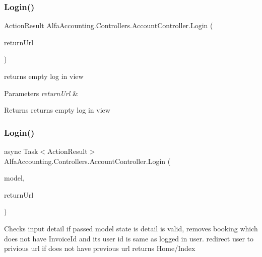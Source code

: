 \subsubsection{\texorpdfstring{Login()}{Login()}\hspace{0.1cm}{\footnotesize\ttfamily [1/2]}}
{\footnotesize\ttfamily Action\+Result Alfa\+Accounting.\+Controllers.\+Account\+Controller.\+Login (\begin{DoxyParamCaption}\item[{string}]{return\+Url }\end{DoxyParamCaption})}



returns empty log in view 


\begin{DoxyParams}{Parameters}
{\em return\+Url} & \\
\hline
\end{DoxyParams}
\begin{DoxyReturn}{Returns}
returns empty log in view
\end{DoxyReturn}
\mbox{\label{class_alfa_accounting_1_1_controllers_1_1_account_controller_af11c863e7062228c7f066a01772b6c5c}} 
\subsubsection{\texorpdfstring{Login()}{Login()}\hspace{0.1cm}{\footnotesize\ttfamily [2/2]}}
{\footnotesize\ttfamily async Task$<$Action\+Result$>$ Alfa\+Accounting.\+Controllers.\+Account\+Controller.\+Login (\begin{DoxyParamCaption}\item[{Login\+View\+Model}]{model,  }\item[{string}]{return\+Url }\end{DoxyParamCaption})}



Checks input detail if passed model state is detail is valid, removes booking which does not have Invoice\+Id and its user id is same as logged in user. redirect user to privious url if does not have previous url returns Home/\+Index 


